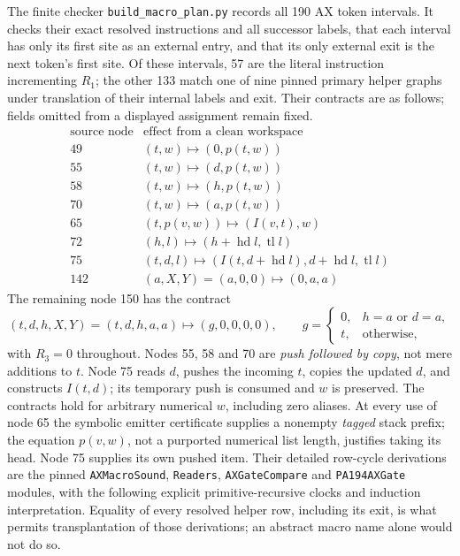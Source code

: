 The finite checker \texttt{build\_macro\_plan.py} records all 190 AX
token intervals.  It checks their exact resolved instructions and
all successor labels, that each interval has only its first site
as an external entry, and that its only external exit is the next
token's first site.  Of these intervals, 57 are the literal
instruction incrementing $R_1$; the other 133 match one of nine
pinned primary helper graphs under translation of their internal
labels and exit.  Their contracts are as follows; fields omitted
from a displayed assignment remain fixed.
\[
\begin{array}{c|l}
 \text{source node}&\text{effect from a clean workspace}\\ \hline
 49&(t,w)\mapsto(0,p(t,w))\\
 55&(t,w)\mapsto(d,p(t,w))\\
 58&(t,w)\mapsto(h,p(t,w))\\
 70&(t,w)\mapsto(a,p(t,w))\\
 65&(t,p(v,w))\mapsto(I(v,t),w)\\
 72&(h,l)\mapsto(h+\operatorname{hd}l,\operatorname{tl}l)\\
 75&(t,d,l)\mapsto(I(t,d+\operatorname{hd}l),
                      d+\operatorname{hd}l,\operatorname{tl}l)\\
 142&(a,X,Y)=(a,0,0)\mapsto(0,a,a)
\end{array}
\]
The remaining node 150 has the contract
\[
 (t,d,h,X,Y)=(t,d,h,a,a)\longmapsto(g,0,0,0,0),
 \qquad
 g=\begin{cases}0,&h=a\text{ or }d=a,\\t,&\text{otherwise,}\end{cases}
\]
with $R_3=0$ throughout.  Nodes 55, 58 and 70 are
\emph{push followed by copy}, not mere additions to $t$.
Node 75 reads $d$, pushes the incoming $t$, copies the updated $d$,
and constructs $I(t,d)$; its temporary push is consumed and $w$
is preserved.  The contracts hold for arbitrary numerical $w$,
including zero aliases.  At every use of node 65 the symbolic
emitter certificate supplies a nonempty \emph{tagged} stack prefix;
the equation $p(v,w)$, not a purported numerical list length,
justifies taking its head.  Node 75 supplies its own pushed item.
Their detailed row-cycle derivations are
the pinned \texttt{AXMacroSound}, \texttt{Readers},
\texttt{AXGateCompare} and \texttt{PA194AXGate} modules, with the
following explicit primitive-recursive clocks and induction
interpretation.  Equality of every resolved helper row, including
its exit, is what permits transplantation of those derivations;
an abstract macro name alone would not do so.

